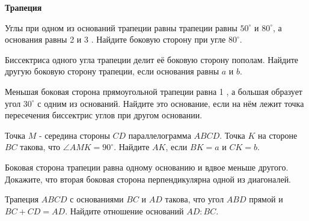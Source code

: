 \centerline{\bf \Huge Трапеция}

\begin{flushright}
        \scriptsize{}
\end{flushright}

Углы при одном из оснований трапеции равны трапеции равны $50^{\circ}$ и $80^{\circ}$, а основания равны 2 и 3 . Найдите боковую сторону при угле $80^{\circ}$.

Биссектриса одного угла трапеции делит её боковую сторону пополам. Найдите другую боковую сторону трапеции, если основания равны $a$ и $b$.

Меньшая боковая сторона прямоугольной трапеции равна 1 , а большая образует угол $30^{\circ}$ с одним из оснований. Найдите это основание, если на нём лежит точка пересечения биссектрис углов при другом основании.

Точка $M$ - середина стороны $C D$ параллелограмма $A B C D$. Точка $K$ на стороне $B C$ такова, что $\angle A M K=90^{\circ}$. Найдите $A K$, если $B K=a$ и $C K=b$.

Боковая сторона трапеции равна одному основанию и вдвое меньше другого. Докажите, что вторая боковая сторона перпендикулярна одной из диагоналей.

Трапеция $A B C D$ с основаниями $B C$ и $A D$ такова, что угол $A B D$ прямой и $B C+C D=A D$. Найдите отношение оснований $A D: B C$.